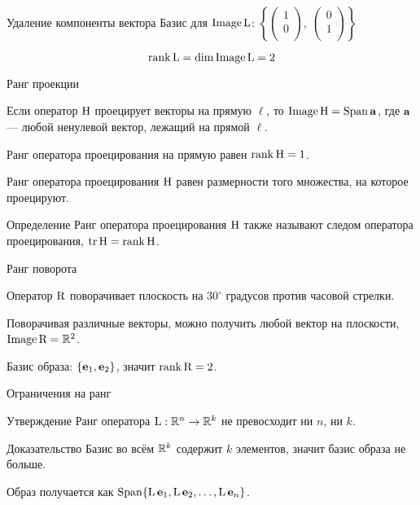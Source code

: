 \begin{frame}{Удаление компоненты вектора}
\pause 
Базис для $\operatorname{Image} \operatorname{L}$: $\left\{\begin{pmatrix}
1 \\
0 \\
\end{pmatrix}, \;
\begin{pmatrix}
0 \\
1 \\
\end{pmatrix} \right\}$

\[
\rank \operatorname{L} = \dim \operatorname{Image} \operatorname{L} = 2    
\]

\end{frame}

\begin{frame}{Ранг проекции}


Если оператор $\mathrm{H}$ проецирует векторы на прямую $\ell$, то $\operatorname{Image} \mathrm{H} = \operatorname{Span} \mathbf{a}$, где $\mathbf{a}$ — любой ненулевой вектор, лежащий на прямой $\ell$.

\pause

Ранг оператора проецирования на прямую равен $\rank \mathrm{H} = 1$.

\pause

Ранг оператора проецирования $\mathrm{H}$ равен размерности того множества, на которое проецируют.

\pause

\begin{block}{Определение}
Ранг оператора проецирования $\mathrm{H}$ также называют \alert{следом оператора проецирования},
$\trace \HH = \rank \HH$.
\end{block}


\end{frame}


\begin{frame}{Ранг поворота}

Оператор $\mathrm{R}$ поворачивает плоскость на $30^{\circ}$ градусов против часовой стрелки.

\pause

Поворачивая различные векторы, можно получить любой вектор на плоскости, $\operatorname{Image} \mathrm{R} = \mathbb{R}^2$.

\pause

Базис образа: $\{ \mathbf{e}_1, \mathbf{e}_2 \}$, значит $\rank \mathrm{R}  = 2$.



\end{frame}
    


\begin{frame}{Ограничения на ранг}

\begin{block}{Утверждение}
Ранг оператора $\operatorname{L}: \mathbb{R}^n \to \mathbb{R}^k$ не превосходит ни $n$, ни $k$. 
\end{block}

\pause

\begin{block}{Доказательство}
Базис во всём $\mathbb{R}^k$ содержит $k$ элементов, значит базис образа не больше.
\pause

Образ получается как $\operatorname{Span}\{\operatorname{L} \mathbf{e}_1, \operatorname{L}\mathbf{e}_2, \ldots, \operatorname{L} \mathbf{e}_n \}$.
\end{block}
\end{frame}

